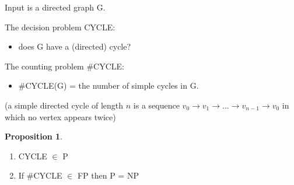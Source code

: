 \documentclass[a4paper,12pt]{article}
\theoremstyle{definition}
\newtheorem{proposition}[counter]{Proposition}
\theoremstyle{remark}
\begin{document}
Input is a directed graph G.

The decision problem CYCLE:
\begin{itemize}
    \item does G have a (directed) cycle?
\end{itemize}

The counting problem $\#$CYCLE:
\begin{itemize}
    \item $\#$CYCLE(G) = the number of simple cycles in G.
\end{itemize}

(a simple directed cycle of length $n$ is a sequence $v_0 \to v_1 \to ... \to v_{n-1} \to v_0$ in which no vertex appears twice)

\begin{proposition}
    \begin{enumerate}
        \item CYCLE $\in$ P
        \item If $\#$CYCLE $\in$ FP then P = NP
    \end{enumerate}
\end{proposition}
\end{document}

